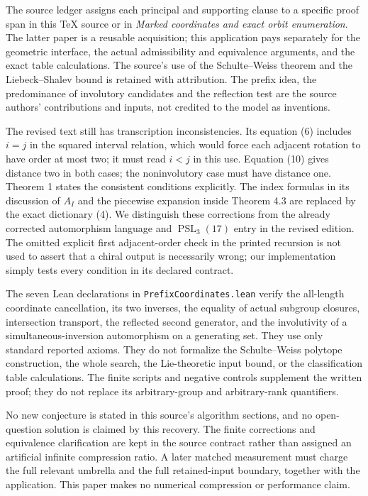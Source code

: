 \documentclass[11pt]{article}
\theoremstyle{remark}\newtheorem{remark}[theorem]{Remark}
\newcommand{\PSL}{\operatorname{PSL}}
\begin{document}
The source ledger assigns each principal and supporting clause to a specific proof span in this TeX source or in \emph{Marked coordinates and exact orbit enumeration}. The latter paper is a reusable acquisition; this application pays separately for the geometric interface, the actual admissibility and equivalence arguments, and the exact table calculations. The source's use of the Schulte--Weiss theorem and the Liebeck--Shalev bound is retained with attribution. The prefix idea, the predominance of involutory candidates and the reflection test are the source authors' contributions and inputs, not credited to the model as inventions.

The revised text still has transcription inconsistencies. Its equation (6) includes $i=j$ in the squared interval relation, which would force each adjacent rotation to have order at most two; it must read $i<j$ in this use. Equation (10) gives distance two in both cases; the noninvolutory case must have distance one. Theorem 1 states the consistent conditions explicitly. The index formulas in its discussion of $A_I$ and the piecewise expansion inside Theorem 4.3 are replaced by the exact dictionary (4). We distinguish these corrections from the already corrected automorphism language and $\PSL_3(17)$ entry in the revised edition. The omitted explicit first adjacent-order check in the printed recursion is not used to assert that a chiral output is necessarily wrong; our implementation simply tests every condition in its declared contract.

The seven Lean declarations in \texttt{PrefixCoordinates.lean} verify the all-length coordinate cancellation, its two inverses, the equality of actual subgroup closures, intersection transport, the reflected second generator, and the involutivity of a simultaneous-inversion automorphism on a generating set. They use only standard reported axioms. They do not formalize the Schulte--Weiss polytope construction, the whole search, the Lie-theoretic input bound, or the classification table calculations. The finite scripts and negative controls supplement the written proof; they do not replace its arbitrary-group and arbitrary-rank quantifiers.

No new conjecture is stated in this source's algorithm sections, and no open-question solution is claimed by this recovery. The finite corrections and equivalence clarification are kept in the source contract rather than assigned an artificial infinite compression ratio. A later matched measurement must charge the full relevant umbrella and the full retained-input boundary, together with the application. This paper makes no numerical compression or performance claim.
\end{document}
